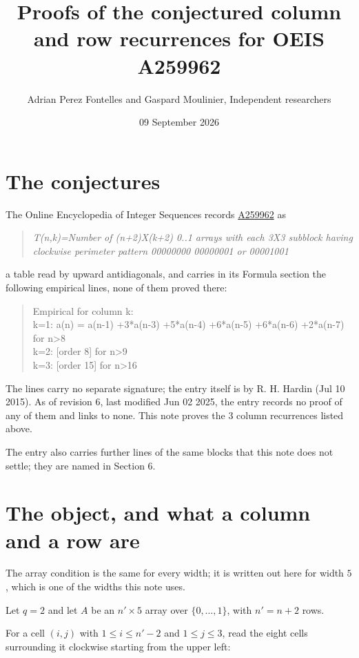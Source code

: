 \documentclass[11pt]{article}
\title{Proofs of the conjectured column and row recurrences for OEIS A259962}
\author{Adrian Perez Fontelles and Gaspard Moulinier, Independent researchers}
\date{09 September 2026}
\theoremstyle{definition}
\begin{document}
\maketitle
\section{The conjectures}

The Online Encyclopedia of Integer Sequences records \href{https://oeis.org/A259962}{A259962} as

\begin{quote}\itshape T(n,k)=Number of (n+2)X(k+2) 0..1 arrays with each 3X3 subblock having clockwise perimeter pattern 00000000 00000001 or 00001001\end{quote}

a table read by upward antidiagonals, and carries in its Formula section the following empirical lines, none of them proved there:

\begin{quote}\ttfamily Empirical for column k:\\
k=1: a(n) = a(n-1) +3*a(n-3) +5*a(n-4) +6*a(n-5) +6*a(n-6) +2*a(n-7) for n>8\\k=2: [order 8] for n>9\\k=3: [order 15] for n>16\end{quote}

The lines carry no separate signature; the entry itself is by R. H. Hardin (Jul 10 2015). As of revision 6, last modified Jun 02 2025, the entry records no proof of any of them and links to none. This note proves the 3 column recurrences listed above.

The entry also carries further lines of the same blocks that this note does not settle; they are named in Section 6.

\section{The object, and what a column and a row are}

The array condition is the same for every width; it is written out here for width $5$, which is one of the widths this note uses.

Let $q = 2$ and let $A$ be an $n' \times 5$ array over $\{0,\dots,1\}$, with $n' = n + 2$ rows.

For a cell $(i,j)$ with $1 \le i \le n'-2$ and $1 \le j \le 3$, read the eight cells surrounding it clockwise starting from the upper left:
\end{document}
